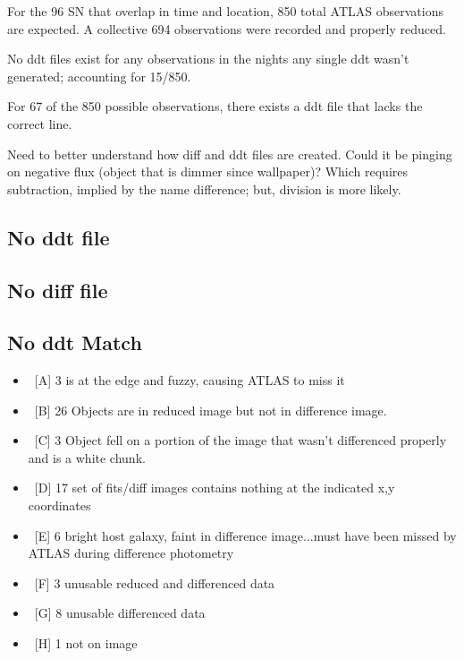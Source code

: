 \documentclass[aps,prb,twocolumn,superscriptaddress]{revtex4-1}
\begin{document}
For the 96 SN that overlap in time and location, 850 total ATLAS 
observations are expected.
A collective 694 observations were recorded and properly reduced. 

No ddt files exist for any observations in the nights any single ddt 
wasn't generated; accounting for 15/850.

For 67 of the 850 possible observations, there exists a ddt file that 
lacks the correct line.

Need to better understand how diff and ddt files are created. Could it 
be pinging on negative flux (object that is dimmer since wallpaper)? 
Which requires subtraction, implied by the name difference; but, division 
is more likely.


\subsection{No ddt file}

\subsection{No diff file}

\subsection{No ddt Match}
\begin{itemize}
	\item{} ~[A] 3 is at the edge and fuzzy, causing ATLAS to miss it
	\item{} ~[B] 26 Objects are in reduced image but not in difference image.
	\item{} ~[C] 3 Object fell on a portion of the image that wasn't differenced properly and is a white chunk.
	\item{} ~[D] 17 set of fits/diff images contains nothing at the indicated x,y coordinates
	\item{} ~[E] 6 bright host galaxy, faint in difference image...must have been missed by ATLAS during difference photometry
	\item{} ~[F] 3 unusable reduced and differenced data
	\item{} ~[G] 8 unusable differenced data
	\item{} ~[H] 1 not on image
\end{itemize}

\end{document}

